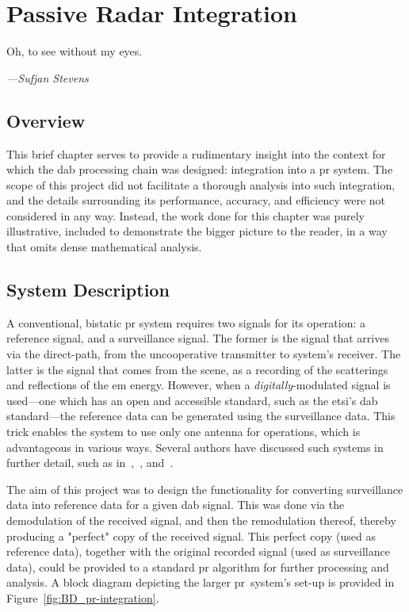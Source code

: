 \documentclass[class=report,11pt,crop=false]{standalone}
\begin{document}
\chapter{Passive Radar Integration \label{ch:pr-integration}}
\epigraph{Oh, to see without my eyes.}%
    {\emph{---Sufjan Stevens}}
\vspace{0.5cm}

\section{Overview}
This brief chapter serves to provide a rudimentary insight into the context for which the \gls{dab} processing chain was designed: integration into a \gls{pr} system. The scope of this project did not facilitate a thorough analysis into such integration, and the details surrounding its performance, accuracy, and efficiency were not considered in any way. Instead, the work done for this chapter was purely illustrative, included to demonstrate the bigger picture to the reader, in a way that omits dense mathematical analysis.

\section{System Description}
A conventional, bistatic \gls{pr} system requires two signals for its operation: a reference signal, and a surveillance signal. The former is the signal that arrives via the direct-path, from the uncooperative transmitter to system's receiver. The latter is the signal that comes from the scene, as a recording of the scatterings and reflections of the \gls{em} energy. However, when a \emph{digitally}-modulated signal is used---one which has an open and accessible standard, such as the \gls{etsi}'s \gls{dab} standard---the reference data can be generated using the surveillance data. This trick enables the system to use only one antenna for operations, which is advantageous in various ways. Several authors have discussed such systems in further detail, such as in~\cite{Barott2014},~\cite{Searle2015}, and~\cite{Fang2018}.

The aim of this project was to design the functionality for converting surveillance data into reference data for a given \gls{dab} signal. This was done via the demodulation of the received signal, and then the remodulation thereof, thereby producing a "perfect" copy of the received signal. This perfect copy (used as reference data), together with the original recorded signal (used as surveillance data), could be provided to a standard \gls{pr} algorithm for further processing and analysis. A block diagram depicting the larger \gls{pr}~system's set-up is provided in Figure~\ref{fig:BD_pr-integration}.
\end{document}
